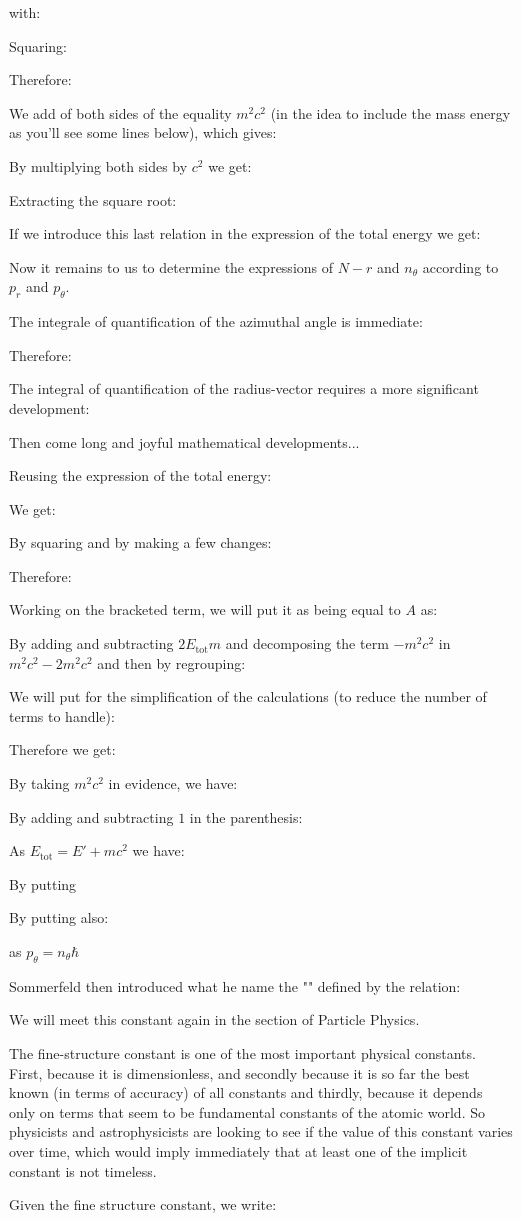 	with:
	
	Squaring:
	
	Therefore:
	
	We add of both sides of the equality $m^2c^2$ (in the idea to include the mass energy as you'll see some lines below), which gives:
	
	By multiplying both sides by $c^2$ we get:
	
	Extracting the square root:
	
	If we introduce this last relation in the expression of the total energy we get:
	
	Now it remains to us to determine the expressions of $N-r$ and $n_\theta$ according to $p_r$ and $p_\theta$.

	The integrale of quantification of the azimuthal angle is immediate:
	
	Therefore:
	
	The integral of quantification of the radius-vector requires a more significant development:
	
	Then come long and joyful mathematical developments...

	Reusing the expression of the total energy:
	
	We get:
	
	By squaring and by making a few changes:
	
	Therefore:
	
	Working on the bracketed term, we will put it as being equal to $A$ as:
	
	By adding and subtracting $2E_\text{tot}m$ and decomposing the term $-m^2c^2$ in $m^2c^2-2m^2c^2$ and then by regrouping:
	
	We will put for the simplification of the calculations (to reduce the number of terms to handle):
	
	Therefore we get:
	
	By taking $m^2c^2$ in evidence, we have:
	
	By adding and subtracting $1$ in the parenthesis:
	
	
	As $E_\text{tot}=E'+mc^2$ we have:
	
	By putting
	
	By putting also:
	
	as $p_\theta=n_\theta\hbar$

	Sommerfeld then introduced what he name the "" defined by the relation:
	
	We will meet this constant again in the section of Particle Physics.
	\begin{tcolorbox}[title=Remark,colframe=black,arc=10pt]
	The fine-structure constant is one of the most important physical constants. First, because it is dimensionless, and secondly because it is so far the best known (in terms of accuracy) of all constants and thirdly, because it depends only on terms that seem to be fundamental constants of the atomic world. So physicists and astrophysicists are looking to see if the value of this constant varies over time, which would imply immediately that at least one of the implicit constant is not timeless.
	\end{tcolorbox}
	Given the fine structure constant, we write:
	
